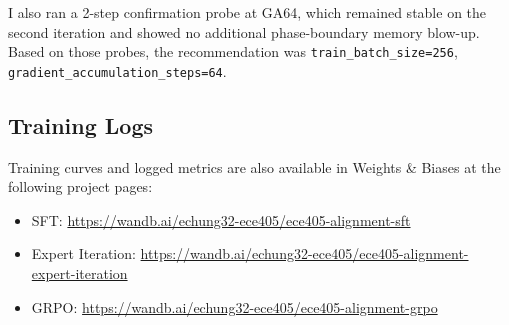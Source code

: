 \documentclass[letterpaper]{article}
\begin{document}
	I also ran a 2-step confirmation probe at GA64, which remained stable on the second iteration and showed no additional phase-boundary memory blow-up. Based on those probes, the recommendation was \texttt{train\_batch\_size=256}, \texttt{gradient\_accumulation\_steps=64}.
	
	\subsection{Training Logs}
	
	Training curves and logged metrics are also available in Weights \& Biases at the following project pages:
	
	\begin{itemize}
		\item SFT: \url{https://wandb.ai/echung32-ece405/ece405-alignment-sft}
		\item Expert Iteration: \url{https://wandb.ai/echung32-ece405/ece405-alignment-expert-iteration}
		\item GRPO: \url{https://wandb.ai/echung32-ece405/ece405-alignment-grpo}
	\end{itemize}
	
\end{document}

